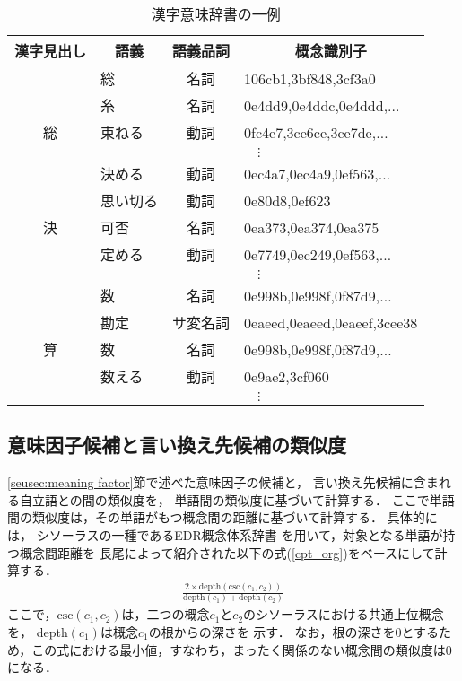 \begin{table}[tb]
 \begin{center}
  \caption{\label{kanwa}漢字意味辞書の一例}
  \begin{tabular}{c|lcl} \hline
   漢字見出し & \multicolumn{1}{c}{語義} & 語義品詞 &
   \multicolumn{1}{c}{概念識別子}  \\ \hline
    & 総 & 名詞 & 106cb1,3bf848,3cf3a0 \\ \cline{2-4}
      & 糸 & 名詞 & 0e4dd9,0e4ddc,0e4ddd,$\ldots$ \\ 
   総   & 束ねる & 動詞 & 0fc4e7,3ce6ce,3ce7de,$\ldots$ \\ \cline{2-4}
      & \multicolumn{3}{|c}{$\vdots$} \\ 
\hline
    & 決める & 動詞 & 0ec4a7,0ec4a9,0ef563,$\ldots$ \\ \cline{2-4}
      & 思い切る & 動詞 & 0e80d8,0ef623\\ \cline{2-4}
 決   & 可否 & 名詞 & 0ea373,0ea374,0ea375\\
      & 定める & 動詞 & 0e7749,0ec249,0ef563,$\ldots$ \\ \cline{2-4}
      & \multicolumn{3}{|c}{$\vdots$} \\ 
   \hline
    & 数  & 名詞 & 0e998b,0e998f,0f87d9,$\ldots$ \\ \cline{2-4}
      & 勘定 & サ変名詞 & 0eaeed,0eaeed,0eaeef,3cee38\\ \cline{2-4}
算      & 数 & 名詞 & 0e998b,0e998f,0f87d9,$\ldots$ \\
      & 数える & 動詞 & 0e9ae2,3cf060 \\ \cline{2-4}
      & \multicolumn{3}{|c}{$\vdots$} \\ \hline
  \end{tabular}
 \end{center}
\end{table}


\subsection{意味因子候補と言い換え先候補の類似度}
\ref{seusec:meaning factor}節で述べた意味因子の候補と，
言い換え先候補に含まれる自立語との間の類似度を，
単語間の類似度に基づいて計算する．
ここで単語間の類似度は，その単語がもつ概念間の距離に基づいて計算する．
具体的には，
シソーラスの一種であるEDR概念体系辞書\cite{edrdic}
を用いて，対象となる単語が持つ概念間距離を
長尾\cite{nagao}によって紹介された以下の式(\ref{cpt_org})をベースにして計算する．
\begin{eqnarray}
 \label{cpt_org}
 \frac{ 2\times \mbox{depth}(\mbox{csc}(c_{1},c_{2}))}{\mbox{depth}(c_{1})+\mbox{depth}(c_{2})}
\end{eqnarray}
ここで，$\mbox{csc}(c_{1},c_{2})$は，二つの概念$c_1$と$c_2$のシソーラスにおける共通上位概念を，
depth$(c_1)$は概念$c_1$の根からの深さを
示す．
なお，根の深さを0とするため，この式における最小値，すなわち，まったく関係のない概念間の類似度は0になる．

